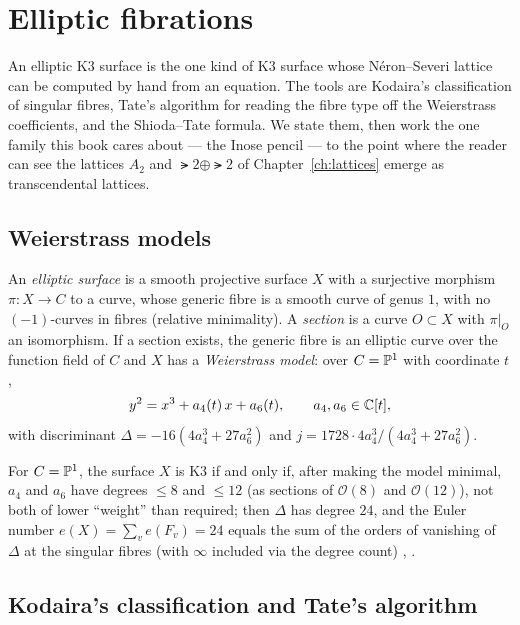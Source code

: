 \chapter{Elliptic fibrations}\label{ch:elliptic}

An elliptic K3 surface is the one kind of K3 surface whose N\'eron--Severi
lattice can be computed by hand from an equation. The tools are Kodaira's
classification of singular fibres, Tate's algorithm for reading the fibre type
off the Weierstrass coefficients, and the Shioda--Tate formula. We state them,
then work the one family this book cares about --- the Inose pencil --- to the
point where the reader can see the lattices $A_2$ and $\lat2\oplus\lat2$ of
Chapter~\ref{ch:lattices} emerge as transcendental lattices.

\section{Weierstrass models}

\begin{definition}
An \emph{elliptic surface} is a smooth projective surface $X$ with a
surjective morphism $\pi\colon X\to C$ to a curve, whose generic fibre is a
smooth curve of genus $1$, with no $(-1)$-curves in fibres (relative
minimality). A \emph{section} is a curve $O\subset X$ with $\pi|_O$ an
isomorphism. If a section exists, the generic fibre is an elliptic curve over
the function field of $C$ and $X$ has a \emph{Weierstrass model}: over
$C=\mathbb{P}^1$ with coordinate $t$,
\[
  y^2=x^3+a_4(t)\,x+a_6(t),\qquad a_4,a_6\in\mathbb{C}[t],
\]
with discriminant $\Delta=-16(4a_4^3+27a_6^2)$ and $j=1728\cdot 4a_4^3/(4a_4^3+27a_6^2)$.
\end{definition}

\begin{theorem}[\Lstatus]\label{thm:k3-weierstrass}
For $C=\mathbb{P}^1$, the surface $X$ is K3 if and only if, after making the model
minimal, $a_4$ and $a_6$ have degrees $\le8$ and $\le12$ (as sections of
$\mathcal O(8)$ and $\mathcal O(12)$), not both of lower ``weight'' than
required; then $\Delta$ has degree $24$, and the Euler number
$e(X)=\sum_v e(F_v)=24$ equals the sum of the orders of vanishing of
$\Delta$ at the singular fibres (with $\infty$ included via the degree
count) \cite[Ch.~11]{Huybrechts2016}, \cite[\S~4]{SchuettShioda2010}.
\end{theorem}

\section{Kodaira's classification and Tate's algorithm}

